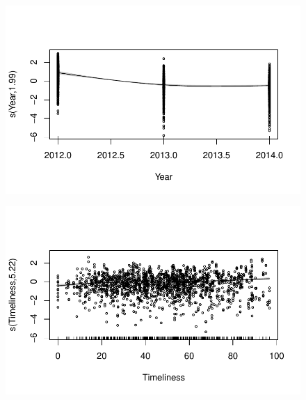 \documentclass[
  letterpaper,
  DIV=11,
  numbers=noendperiod]{scrartcl}
\begin{document}
\begin{figure}[H]

{\centering \includegraphics{Group34Coursework_files/figure-pdf/unnamed-chunk-18-8.pdf}

}

\end{figure}

\begin{figure}[H]

{\centering \includegraphics{Group34Coursework_files/figure-pdf/unnamed-chunk-18-9.pdf}

}

\end{figure}
\end{document}
